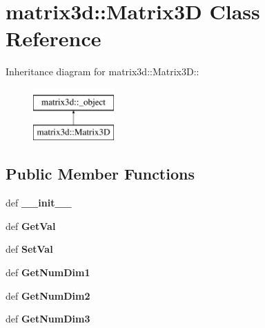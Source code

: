 \hypertarget{classmatrix3d_1_1Matrix3D}{
\section{matrix3d::Matrix3D Class Reference}
\label{d4/dbb/classmatrix3d_1_1Matrix3D}
}
Inheritance diagram for matrix3d::Matrix3D::\begin{figure}[H]
\begin{center}
\leavevmode
\includegraphics[height=2cm]{d4/dbb/classmatrix3d_1_1Matrix3D}
\end{center}
\end{figure}
\subsection*{Public Member Functions}
\begin{DoxyCompactItemize}
\item 
\hypertarget{classmatrix3d_1_1Matrix3D_afc828ef75c2d6fda473bab6673006fc2}{
def {\bfseries \_\-\_\-init\_\-\_\-}}
\label{d4/dbb/classmatrix3d_1_1Matrix3D_afc828ef75c2d6fda473bab6673006fc2}

\item 
\hypertarget{classmatrix3d_1_1Matrix3D_a9647e57d80350d7910056de98e6bfc2a}{
def {\bfseries GetVal}}
\label{d4/dbb/classmatrix3d_1_1Matrix3D_a9647e57d80350d7910056de98e6bfc2a}

\item 
\hypertarget{classmatrix3d_1_1Matrix3D_a1996596a1f5a693c6f8e320aef7b7710}{
def {\bfseries SetVal}}
\label{d4/dbb/classmatrix3d_1_1Matrix3D_a1996596a1f5a693c6f8e320aef7b7710}

\item 
\hypertarget{classmatrix3d_1_1Matrix3D_a6b2c6828d4b23fac9e5d73947cd8fd5c}{
def {\bfseries GetNumDim1}}
\label{d4/dbb/classmatrix3d_1_1Matrix3D_a6b2c6828d4b23fac9e5d73947cd8fd5c}

\item 
\hypertarget{classmatrix3d_1_1Matrix3D_a11ba8f2b438f400343f199d3eb858714}{
def {\bfseries GetNumDim2}}
\label{d4/dbb/classmatrix3d_1_1Matrix3D_a11ba8f2b438f400343f199d3eb858714}

\item 
\hypertarget{classmatrix3d_1_1Matrix3D_a23d415fad6978cae908870e45ebc30cc}{
def {\bfseries GetNumDim3}}
\label{d4/dbb/classmatrix3d_1_1Matrix3D_a23d415fad6978cae908870e45ebc30cc}

\end{DoxyCompactItemize}
